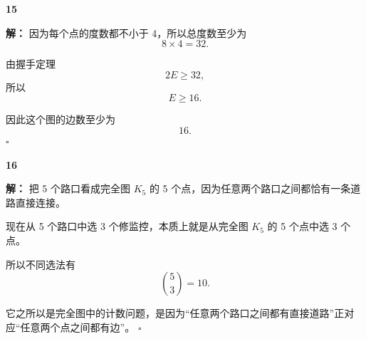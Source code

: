 \documentclass[11pt,a4paper,fontset=fandol]{ctexart}
\theoremstyle{formalexample}
\newenvironment{solution}{\par\noindent\textbf{解：}}{\hfill$\square$\par}
\begin{document}
\textbf{15}\begin{solution}
因为每个点的度数都不小于 4，所以总度数至少为
\[
8\times 4=32.
\]

由握手定理
\[
2E\ge 32,
\]
所以
\[
E\ge 16.
\]

因此这个图的边数至少为
\[
16.
\]
\end{solution}

\textbf{16}\begin{solution}
把 5 个路口看成完全图 $K_5$ 的 5 个点，因为任意两个路口之间都恰有一条道路直接连接。

现在从 5 个路口中选 3 个修监控，本质上就是从完全图 $K_5$ 的 5 个点中选 3 个点。

所以不同选法有
\[
\binom53=10.
\]

它之所以是完全图中的计数问题，是因为“任意两个路口之间都有直接道路”正对应“任意两个点之间都有边”。
\end{solution}
\end{document}

